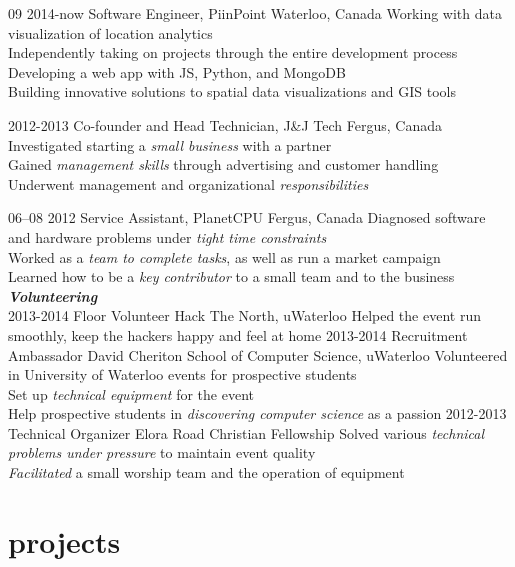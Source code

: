 \documentclass[]{friggeri-cv-short}
\newcommand{\imp}[1] {{\em #1}}
\begin{document}
\begin{entrylist}
  \entry
  	{09 2014-now}
  	{Software Engineer, PiinPoint}
  	{Waterloo, Canada}
  	{Working with data visualization of location analytics \\
  	 Independently taking on projects through the entire development process \\
    Developing a web app with JS, Python, and MongoDB \\
    Building innovative solutions to spatial data visualizations and GIS tools}

  \entry
  	{2012-2013}
  	{Co-founder and Head Technician, J\&J Tech}
  	{Fergus, Canada}
  	{Investigated starting a \imp{small business} with a partner \\
	Gained \imp{management skills} through advertising and customer handling \\
	Underwent management and organizational \imp{responsibilities}}
	
  \entry
    {06–08 2012}
    {Service Assistant, PlanetCPU}
    {Fergus, Canada}
    {Diagnosed software and hardware problems under \imp{tight time constraints} \\	Worked as a \imp{team to complete tasks}, as well as run a market campaign \\
    Learned how to be a \imp{key contributor} to a small team and to the business}
\textbf{\emph{Volunteering}} \\    
  \entry
  	{2013-2014}
  	{Floor Volunteer}
  	{Hack The North, uWaterloo}
	{Helped the event run smoothly, keep the hackers happy and feel at home}
  \entry
  	{2013-2014}
  	{Recruitment Ambassador}
  	{David Cheriton School of Computer Science, uWaterloo}
	{Volunteered in University of Waterloo events for prospective students \\
  	Set up \imp{technical equipment}  for the event \\
	Help prospective students in \imp{discovering computer science} as a passion}
  \entry
  	{2012-2013}
  	{Technical Organizer}
  	{Elora Road Christian Fellowship}
	{Solved various \imp{technical problems under pressure} to maintain event quality\\
	\imp{Facilitated} a small worship team and the operation of equipment}
\end{entrylist}



\section{projects}
\end{document}
